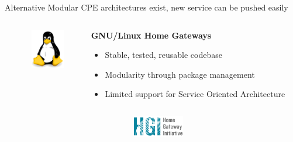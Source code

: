 \documentclass[a4paper]{beamer}
\begin{document}
\begin{frame}{Alternative Modular CPE architectures exist, new service can be pushed easily}
					
					
	\begin{columns}[T]
		\begin{column}{.01\textwidth} %
		\end{column}
		\begin{column}[T]{0.15 \textwidth} 
			\vspace{1em}
			\includegraphics[width=4em]{tux.png}
		\end{column}
																		
																						
		\begin{column}[T]{0.70 \textwidth} 
																																	
																																		   
			\textbf{ GNU/Linux Home Gateways}
			\begin{itemize}
				\item Stable, tested, reusable codebase
				\item Modularity through package management
				\item Limited support for Service Oriented Architecture
			\end{itemize}
			\vspace{3mm}
																																		     
																																	
		\end{column}
																						
	\end{columns}
						
						
	\begin{columns}[T]
		\begin{column}{.01\textwidth} %
		\end{column}
		\begin{column}[T]{0.15 \textwidth} 
			\vspace{2em}
			\includegraphics[width=6em]{hgi.png}
		\end{column}
																		

\end{columns}
\end{frame}
\end{document}
